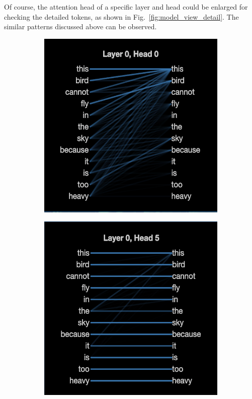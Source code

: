 \documentclass[]{article}
\begin{document}
Of course, the attention head of a specific layer and head could be enlarged for checking the detailed tokens, as shown in Fig.~\ref{fig:model_view_detail}. The similar patterns discussed above can be observed.

\begin{figure}[!h]
    \centering
    \begin{subfigure}[b]{0.32\textwidth}
        \includegraphics[width=\textwidth]{FIGS/gpt2_model_L0H0.png}
    \end{subfigure}
    \hfill
    \begin{subfigure}[b]{0.32\textwidth}
        \includegraphics[width=\textwidth]{FIGS/gpt2_model_L0H5.png}

\end{subfigure}
\end{figure}
\end{document}
